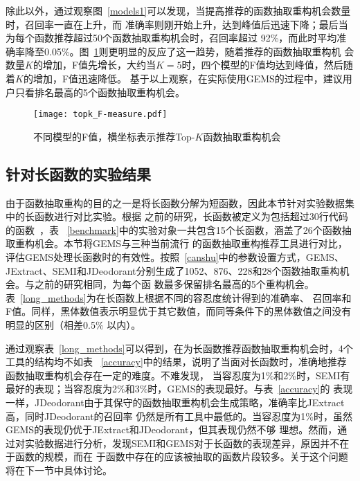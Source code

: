 除此以外，通过观察图~\ref{models1}可以发现，当提高推荐的函数抽取重构机会数量时，召回率一直在上升，而
准确率则刚开始上升，达到峰值后迅速下降；最后当为每个函数推荐超过50个函数抽取重构机会时，召回率超过
92\%，而此时平均准确率降至0.05\%。图~\ref{models2}则更明显的反应了这一趋势，随着推荐的函数抽取重构机
会数量$K$的增加，F值先增长，大约当$K=5$时，四个模型的F值均达到峰值，然后随着$K$的增加，F值迅速降低。
基于以上观察，在实际使用GEMS的过程中，建议用户只看排名最高的5个函数抽取重构机会。

\begin{figure}
\centering
\texttt{[image: topk\_F-measure.pdf]}
\caption{不同模型的F值，横坐标表示推荐Top-$K$函数抽取重构机会}
\label{models2}
\end{figure}

\subsection{针对长函数的实验结果}\label{RQ4}
由于函数抽取重构的目的之一是将长函数分解为短函数，因此本节针对实验数据集中的长函数进行对比实验。根据
之前的研究，长函数被定义为包括超过30行代码的函数~\cite{charalampidou2016identifying}，表
~\ref{benchmark}中的实验对象一共包含15个长函数，涵盖了26个函数抽取重构机会。本节将GEMS与三种当前流行
的函数抽取重构推荐工具进行对比，评估GEMS处理长函数时的有效性。按照~\ref{canshu}中的参数设置方式，GEMS、
JExtract、SEMI和JDeodorant分别生成了1052、876、228和28个函数抽取重构机会。与之前的研究相同，为每个函
数最多保留排名最高的5个重构机会。表~\ref{long_methods}为在长函数上根据不同的容忍度统计得到的准确率、
召回率和F值。同样，黑体数值表示明显优于其它数值，而同等条件下的黑体数值之间没有明显的区别（相差0.5\%
以内）。

通过观察表~\ref{long_methods}可以得到，在为长函数推荐函数抽取重构机会时，4个工具的结构均不如表
~\ref{accuracy}中的结果，说明了当面对长函数时，准确地推荐函数抽取重构机会存在一定的难度。不难发现，
当容忍度为1\%和2\%时，SEMI有最好的表现；当容忍度为2\%和3\%时，GEMS的表现最好。与表~\ref{accuracy}的
表现一样，JDeodorant由于其保守的函数抽取重构机会生成策略，准确率比JExtract高，同时JDeodorant的召回率
仍然是所有工具中最低的。当容忍度为1\%时，虽然GEMS的表现仍优于JExtract和JDeodorant，但其表现仍然不够
理想。然而，通过对实验数据进行分析，发现SEMI和GEMS对于长函数的表现差异，原因并不在于函数的规模，而在
于函数中存在的应该被抽取的函数片段较多。关于这个问题将在下一节中具体讨论。

